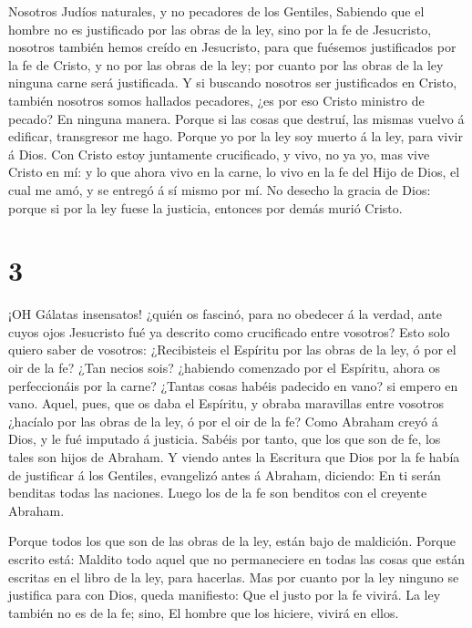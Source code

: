  Nosotros Judíos naturales, y no pecadores de los Gentiles,
 Sabiendo que el hombre no es justificado por las obras de
la ley, sino por la fe de Jesucristo, nosotros también hemos creído en
Jesucristo, para que fuésemos justificados por la fe de Cristo, y no por
las obras de la ley; por cuanto por las obras de la ley ninguna carne
será justificada.  Y si buscando nosotros ser justificados
en Cristo, también nosotros somos hallados pecadores, ¿es por eso Cristo
ministro de pecado? En ninguna manera.  Porque si las cosas
que destruí, las mismas vuelvo á edificar, transgresor me hago.
 Porque yo por la ley soy muerto á la ley, para vivir á
Dios.  Con Cristo estoy juntamente crucificado, y vivo, no
ya yo, mas vive Cristo en mí: y lo que ahora vivo en la carne, lo vivo
en la fe del Hijo de Dios, el cual me amó, y se entregó á sí mismo por
mí.  No desecho la gracia de Dios: porque si por la ley
fuese la justicia, entonces por demás murió Cristo.

\hypertarget{section-2}{%
\section{3}\label{section-2}}

 ¡OH Gálatas insensatos! ¿quién os fascinó, para no obedecer
á la verdad, ante cuyos ojos Jesucristo fué ya descrito como crucificado
entre vosotros?  Esto solo quiero saber de vosotros:
¿Recibisteis el Espíritu por las obras de la ley, ó por el oir de la fe?
 ¿Tan necios sois? ¿habiendo comenzado por el Espíritu,
ahora os perfeccionáis por la carne?  ¿Tantas cosas habéis
padecido en vano? si empero en vano.  Aquel, pues, que os
daba el Espíritu, y obraba maravillas entre vosotros ¿hacíalo por las
obras de la ley, ó por el oir de la fe?  Como Abraham creyó
á Dios, y le fué imputado á justicia.  Sabéis por tanto, que
los que son de fe, los tales son hijos de Abraham.  Y viendo
antes la Escritura que Dios por la fe había de justificar á los
Gentiles, evangelizó antes á Abraham, diciendo: En ti serán benditas
todas las naciones.  Luego los de la fe son benditos con el
creyente Abraham.

 Porque todos los que son de las obras de la ley, están
bajo de maldición. Porque escrito está: Maldito todo aquel que no
permaneciere en todas las cosas que están escritas en el libro de la
ley, para hacerlas.  Mas por cuanto por la ley ninguno se
justifica para con Dios, queda manifiesto: Que el justo por la fe
vivirá.  La ley también no es de la fe; sino, El hombre que
los hiciere, vivirá en ellos.

